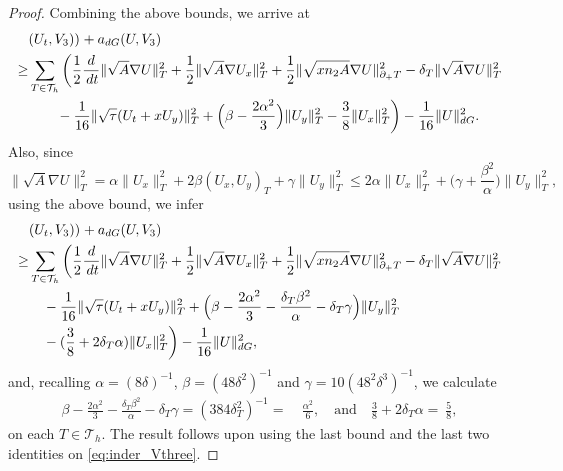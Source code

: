 \documentclass[10pt,a4paper]{amsart}
\newcommand{\Th}{\mathcal{T}_h}
\newcommand{\dee}{{\rm d}}
\newcommand{\dt}{\,{\rm dt}}
\newcommand{\inner}[3]{({#1},{#2})_{{#3}}}
\newcommand{\norm}[2]{\|{#1}\|_{{#2}}}
\newcommand{\normal}{{n}}
\begin{document}
\begin{proof}
	Combining the above bounds, we arrive at
\begin{equation}\label{eq:inder_Vthree}
	\begin{aligned}
			&     \inner{U_t}{V_3)}{}  +    a_{\rm dG}(U,V_3) \\
		\geq
	&		\sum_{T \in \Th} \bigg(
		\frac{1}{2} \frac{\dee}{\dt} \norm{\sqrt{A} \nabla U}{T}^2
		+
	\frac{1}{2}  \norm{\sqrt{A}\nabla U_x}{T}^2+	\frac{1}{2} \norm{ \sqrt{x\normal_2 A}\nabla U }{\partial_+ T}^2- \delta_T\norm{\sqrt{A}\nabla U}{T}^2
		\\
	&\qquad	-			\frac{1}{16}	\norm{ \sqrt{\tau} (U_t+ x U_y)}{T}^2
		+ \Big(\beta-\frac{2\alpha^2}{3}\Big)\norm{U_y}{T}^2	-	\frac{3}{8} \norm{U_x}{T} ^2\bigg)	-\frac{1}{16}\norm{U}{\rm dG}^2.
	\end{aligned}
\end{equation}
Also, since
\[
\|\sqrt{A}\nabla U\|_T^2= \alpha \|U_x\|_T^2+ 2\beta (U_x, U_y)_T + \gamma \|U_y\|_T^2\le  2\alpha \|U_x\|_T^2+\Big( \gamma + \frac{\beta^2}{\alpha }\Big) \|U_y\|_T^2,
\]
 {using the above bound, we infer
\[
	\begin{aligned}
			&     \inner{U_t}{V_3)}{}  +    a_{\rm dG}(U,V_3) \\
		\geq
	&		\sum_{T \in \Th} \bigg(
		\frac{1}{2} \frac{\dee}{\dt} \norm{\sqrt{A} \nabla U}{T}^2
		+
	\frac{1}{2}  \norm{\sqrt{A}\nabla U_x}{T}^2+	\frac{1}{2} \norm{ \sqrt{x\normal_2 A}\nabla U }{\partial_+ T}^2- \delta_T\norm{\sqrt{A}\nabla U}{T}^2
		\\
	&\quad	-			\frac{1}{16}	\norm{ \sqrt{\tau} (U_t+ x U_y)}{T}^2
		+ \Big(	\beta -\frac{2\alpha^2}{3} - \frac{\delta_T \beta^2}{\alpha} -\delta_T \gamma\Big)\norm{U_y}{T}^2
\\	&\quad 	-	(\frac{3}{8} +2\delta_T \alpha) \norm{U_x}{T} ^2\bigg)
-\frac{1}{16}\norm{U}{\rm dG}^2,
	\end{aligned}
\]}
and, 	recalling $\alpha = (8\delta)^{-1}$, $\beta = (48\delta^2)^{-1}$ and $\gamma = 10(48^2\delta^3)^{-1}$, we calculate
	\begin{equation*}\begin{split}
		\beta -\frac{2\alpha^2}{3} - \frac{\delta_T \beta^2}{\alpha} -\delta_T \gamma
		=
		(384 \delta_T^2)^{-1} =&\ \frac{\alpha^2}{6}, \quad\text{and}\quad
		 \frac{3}{8 }  +2\delta_T \alpha =\ \frac{5}{8},
\end{split}\end{equation*}
on each $T\in\Th$.
The result follows upon using the last bound and the last two identities on \eqref{eq:inder_Vthree}.
\end{proof}
\end{document}
